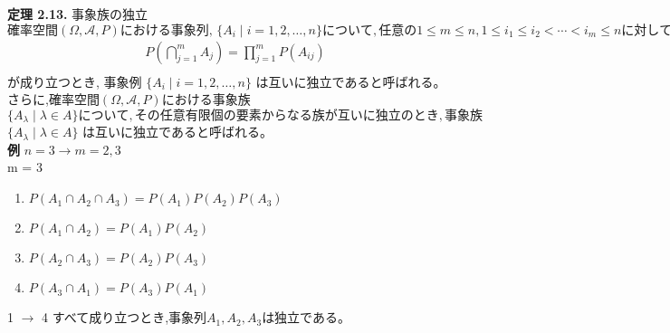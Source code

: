 \documentclass[dvipdfmx,10pt, a4j]{jarticle}
\theoremstyle{definition}
\begin{document}
\noindent
\textbf{定理 2.13.} 事象族の独立\\
$確率空間 (\Omega, \mathcal{A}, P)における事象列, \, \{A_i \mid i = 1,2, \dots ,n\}について, 任意の1 \leq m \leq n, 1 \leq i_1 \leq i_2 < \cdots < i_m \leq n に対して,$\\
\begin{align*}
    P(\bigcap_{j=1}^{m}{A_j}) = \prod_{j=1}^{m}{P(A_{ij})}\\
\end{align*}
が成り立つとき, 事象例 $\{A_i \mid i = 1,2, \dots ,n \}$ は互いに独立であると呼ばれる。\\
さらに,$確率空間 (\Omega, \mathcal{A}, P)$における事象族 $\{ A_{\lambda} \mid \lambda \in A \}について,その任意有限個の要素からなる族が互いに独立のとき,事象族$
$\{ A_{\lambda} \mid \lambda \in A \}$ は互いに独立であると呼ばれる。\\

\textbf{例} $n = 3 \rightarrow m = 2,3$\\
m = 3\\
\begin{enumerate}[1)]
    \item $P(A_1 \cap A_2 \cap A_3) = P(A_1)P(A_2)P(A_3)$\\
    \item $P(A_1 \cap A_2) = P(A_1)P(A_2)$\\
    \item $P(A_2 \cap A_3) = P(A_2)P(A_3)$\\
    \item $P(A_3 \cap A_1) = P(A_3)P(A_1)$\\
\end{enumerate}
1 $\to$ 4 すべて成り立つとき,事象列$A_1, A_2, A_3$は独立である。\\
\end{document}
